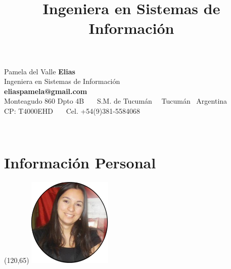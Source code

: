 \documentclass[11pt,a4paper,sans]{moderncv} %
\title{Ingeniera en Sistemas de Informaci\'on}
\begin{document}

\begin{center}
  {\fontsize{34}{36}\mdseries\upshape Pamela del Valle \textbf{Elias}} \\ 
  {\Large Ingeniera en Sistemas de Informaci\'on} \\ 
  \textbf{eliaspamela@gmail.com}  \\
  Monteagudo 860 Dpto 4B \ \textbullet \ \ S.M. de Tucum\'an \ \textbullet  \ Tucum\'an \textbullet \  Argentina \\
  CP: T4000EHD \ \textbullet \ \  Cel. +54(9)381-5584068 \\

\end{center}

\ \ 



\section{Informaci\'on Personal} %

\begin{textblock}{10}(120,65)
      \includegraphics{pictures/foto_cortada_2.png}
    \end{textblock}

\end{document}
